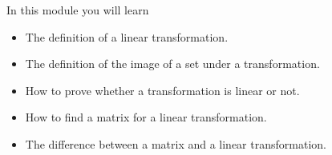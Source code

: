 \begin{module}

	In this module you will learn
	\begin{itemize}
		\item The definition of a linear transformation.
		\item The definition of the image of a set under a transformation.
		\item How to prove whether a transformation is linear or not.
		\item How to find a matrix for a linear transformation.
		\item The difference between a matrix and a linear transformation.
	\end{itemize}

	
	
\end{module}
